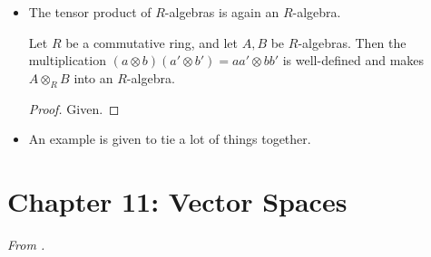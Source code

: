 \documentclass[../notes.tex]{subfiles}
\begin{document}
\begin{itemize}
\begin{itemize}
    \end{itemize}
    \item The tensor product of $R$-algebras is again an $R$-algebra.
    \begin{proposition}\label{prp:10.21}
        Let $R$ be a commutative ring, and let $A,B$ be $R$-algebras. Then the multiplication $(a\otimes b)(a'\otimes b')=aa'\otimes bb'$ is well-defined and makes $A\otimes_RB$ into an $R$-algebra.
        \begin{proof}
            Given.
        \end{proof}
    \end{proposition}
    \item An example is given to tie a lot of things together.
\end{itemize}



\section{Chapter 11: Vector Spaces}
\emph{From \textcite{bib:DummitFoote}.}
\setcounter{bookch}{11}
\setcounter{proposition}{21}
\end{document}
